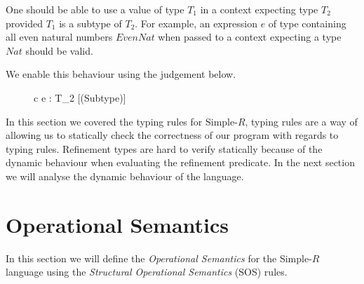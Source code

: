 \documentclass[a4paper,12pt]{report}
\begin{document}
\par
One should be able to use a value of type $T_1$ in a context 
expecting type $T_2$ provided $T_1$ is a subtype of $T_2$. For example, an 
expression $e$ of type containing all even natural numbers $EvenNat$ when passed 
to a context expecting a type $Nat$ should be valid. 

\par
We enable this behaviour using the judgement below.
\begin{figure}[H]
  \begin{center}
    \begin{tabular} {c}
      {\Gamma \vdash e : T_2} [(Subtype)]
    \end{tabular}
  \end{center}
\end{figure}

\par
In this section we covered the typing rules for Simple-$R$, typing rules are a 
way of allowing us to statically check the correctness of our program with 
regards to typing rules. Refinement types are hard to verify statically because 
of the dynamic behaviour when evaluating the refinement predicate. In the next 
section we will analyse the dynamic behaviour of the language. 

\section{Operational Semantics}
In this section we will define the \textit{Operational Semantics} 
\cite{operationalSemantics} for the Simple-$R$ language 
using the \textit{Structural Operational Semantics} \cite{plotkinSOS} (SOS) rules.
\end{document}
